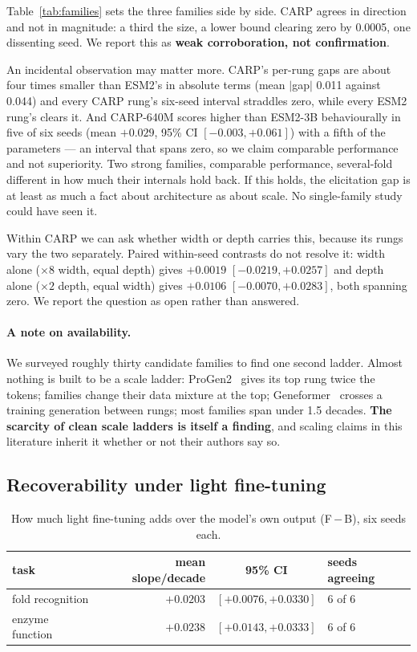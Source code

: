 \documentclass[11pt]{article}
\begin{document}
Table~\ref{tab:families} sets the three families side by side. CARP agrees in
direction and not in magnitude: a third the size, a lower bound
clearing zero by 0.0005, one dissenting seed. We report this as \textbf{weak
corroboration, not confirmation}.

An incidental observation may matter more. CARP's per-rung gaps are about four
times smaller than ESM2's in absolute terms (mean $|$gap$|$ 0.011 against 0.044)
and every CARP rung's six-seed interval straddles zero, while every ESM2 rung's
clears it. And CARP-640M scores higher than ESM2-3B behaviourally in five of six
seeds (mean $+0.029$, 95\% CI $[-0.003, +0.061]$) with a fifth of the parameters
--- an interval that spans zero, so we claim comparable performance and not
superiority. Two strong families, comparable performance, several-fold different
in how much their internals hold back. If this holds, the elicitation gap is at
least as much a fact about architecture as about scale. No single-family study
could have seen it.

Within CARP we can ask whether width or depth carries this, because its rungs vary
the two separately. Paired within-seed contrasts do not resolve it: width alone
($\times 8$ width, equal depth) gives $+0.0019$ $[-0.0219, +0.0257]$ and depth
alone ($\times 2$ depth, equal width) gives $+0.0106$ $[-0.0070, +0.0283]$, both
spanning zero. We report the question as open rather than answered.

\paragraph{A note on availability.} We surveyed roughly thirty candidate families
to find one second ladder. Almost nothing is built to be a scale ladder:
ProGen2~\citep{nijkamp2023progen2} gives its top rung twice the tokens; families
change their data mixture at the top; Geneformer~\citep{theodoris2023geneformer}
crosses a training generation between rungs; most families span under 1.5 decades.
\textbf{The scarcity of clean scale ladders is itself a finding}, and scaling
claims in this literature inherit it whether or not their authors say so.

\subsection{Recoverability under light fine-tuning}

\begin{table}[h]
\centering
\small
\begin{tabular}{@{}lrcl@{}}
\toprule
\textbf{task} & \textbf{mean slope/decade} & \textbf{95\% CI} &
\textbf{seeds agreeing} \\
\midrule
fold recognition & $+0.0203$ & $[+0.0076, +0.0330]$ & 6 of 6 \\
enzyme function & $+0.0238$ & $[+0.0143, +0.0333]$ & 6 of 6 \\
\bottomrule
\end{tabular}
\caption{How much light fine-tuning adds over the model's own output
(F\,$-$\,B), six seeds each.}
\label{tab:recov}
\end{table}
\end{document}
